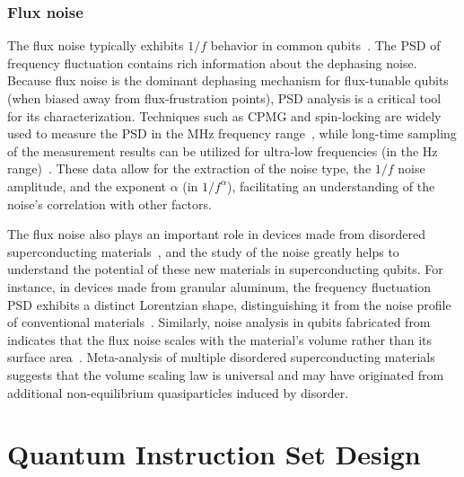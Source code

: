\documentclass[a4paper,onecolumn,11pt,unpublished]{quantumarticle}
\begin{document}
\subsubsection{Flux noise}
The flux noise typically exhibits $1/f$ behavior in common qubits~\cite{Yoshihara2006Decoherence,Koch2007Model,Yan2012Spectroscopy,Anton2012Pure,Bylander2011Noise,Yan2013Rotatingframe,Quintana2017Observation,Braumuller2020Characterizing}. The PSD of frequency fluctuation contains rich information about the dephasing noise. Because flux noise is the dominant dephasing mechanism for flux-tunable qubits (when biased away from flux-frustration points), PSD analysis is a critical tool for its characterization. Techniques such as CPMG and spin-locking are widely used to measure the PSD in the MHz frequency range~\cite{Bylander2011Noise,Yan2013Rotatingframe}, while long-time sampling of the measurement results can be utilized for ultra-low frequencies (in the Hz range)~\cite{Quintana2017Observation}. These data allow for the extraction of the noise type, the $1/f$ noise amplitude, and the exponent $\alpha$ (in $1/f^{\alpha}$), facilitating an understanding of the noise's correlation with other factors. 

The flux noise also plays an important role in devices made from disordered superconducting materials~\cite{Grunhaupt2019Granular,Maleeva2018Circuit,Kristen2023Random,Kristen2023Observation,Rieger2023Granular,Hazard2019Nanowire}, and the study of the noise greatly helps to understand the potential of these new materials in superconducting qubits. For instance, in devices made from granular aluminum, the frequency fluctuation PSD exhibits a distinct Lorentzian shape, distinguishing it from the noise profile of conventional materials~\cite{Kristen2023Random}. Similarly, noise analysis in qubits fabricated from  indicates that the flux noise scales with the material's volume rather than its surface area~\cite{Gao2025The}.
Meta-analysis of multiple disordered superconducting materials suggests that the volume scaling law is universal and may have originated from additional non-equilibrium quasiparticles induced by disorder\cite{Charpentier2025Universal}.

\section{Quantum Instruction Set Design}\label{sec:qisa}
\end{document}
